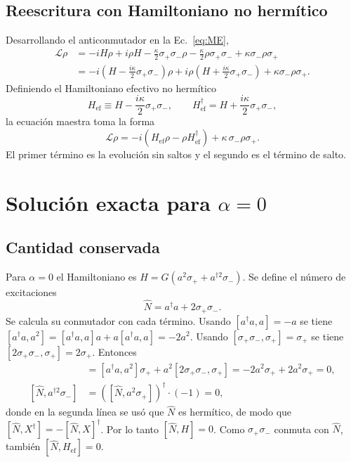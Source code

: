 \documentclass[11pt]{report}
\newcommand{\spl}{\sigma_{+}}
\newcommand{\smi}{\sigma_{-}}
\newcommand{\Lv}{\mathcal{L}}
\begin{document}
\subsection{Reescritura con Hamiltoniano no herm\'itico}

Desarrollando el anticonmutador en la Ec.~\eqref{eq:ME},
\begin{align}
\Lv\rho &= -iH\rho + i\rho H - \frac{\kappa}{2}\spl\smi\rho - \frac{\kappa}{2}\rho\spl\smi + \kappa\smi\rho\spl\\
&= -i\left(H - \frac{i\kappa}{2}\spl\smi\right)\rho + i\rho\left(H + \frac{i\kappa}{2}\spl\smi\right) + \kappa\smi\rho\spl.
\end{align}
Definiendo el Hamiltoniano efectivo no herm\'itico
\begin{equation}
H_{\mathrm{ef}} \equiv H - \frac{i\kappa}{2}\spl\smi,
\qquad
H_{\mathrm{ef}}^{\dagger} = H + \frac{i\kappa}{2}\spl\smi,
\end{equation}
la ecuaci\'on maestra toma la forma
\begin{equation}
\Lv\rho = -i\left(H_{\mathrm{ef}}\rho - \rho H_{\mathrm{ef}}^{\dagger}\right) + \kappa\,\smi\rho\spl .
\label{eq:MEnh}
\end{equation}
El primer t\'ermino es la evoluci\'on sin saltos y el segundo es el t\'ermino de salto.

\section{Soluci\'on exacta para $\alpha=0$}

\subsection{Cantidad conservada}

Para $\alpha=0$ el Hamiltoniano es $H=G(a^{2}\spl + a^{\dagger 2}\smi)$. Se define el n\'umero de excitaciones
\begin{equation}
\hat N = a^{\dagger}a + 2\spl\smi .
\end{equation}
Se calcula su conmutador con cada t\'ermino. Usando $[a^{\dagger}a,a]=-a$ se tiene $[a^{\dagger}a,a^{2}]=[a^{\dagger}a,a]a+a[a^{\dagger}a,a]=-2a^{2}$. Usando $[\spl\smi,\spl]=\spl$ se tiene $[2\spl\smi,\spl]=2\spl$. Entonces
\begin{align}
[\hat N, a^{2}\spl] &= [a^{\dagger}a,a^{2}]\spl + a^{2}[2\spl\smi,\spl] = -2a^{2}\spl + 2a^{2}\spl = 0,\\
[\hat N, a^{\dagger 2}\smi] &= \left([\hat N,a^{2}\spl]\right)^{\dagger}\cdot(-1) = 0,
\end{align}
donde en la segunda l\'inea se us\'o que $\hat N$ es herm\'itico, de modo que $[\hat N,X^{\dagger}]=-[\hat N,X]^{\dagger}$. Por lo tanto $[\hat N,H]=0$. Como $\spl\smi$ conmuta con $\hat N$, tambi\'en $[\hat N,H_{\mathrm{ef}}]=0$.
\end{document}

